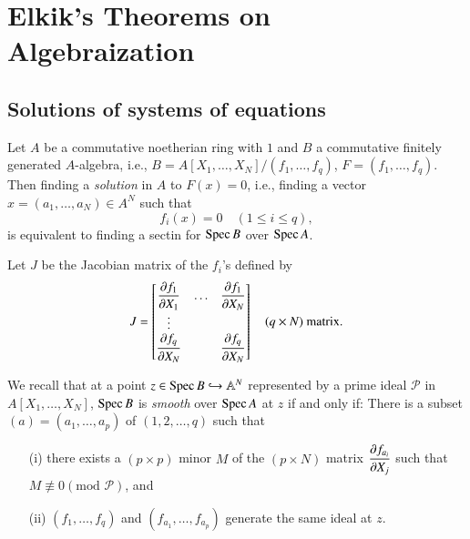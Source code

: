 
\makeatletter
\def\@makechapterhead#1{%
  \vspace*{50\p@}%
  {\parindent \z@ \raggedright \normalfont
    \ifnum \c@secnumdepth >\m@ne
      \if@mainmatter
        \huge\bfseries Part\space \thechapter
       \par\nobreak
        \vskip 20\p@
      \fi
    \fi
    \interlinepenalty\@M
    \Huge \bfseries #1 \par\nobreak
    \vskip 40\p@
  }}
\makeatother

\chapter{Elkik's Theorems on Algebraization}\label{part2}

\section{Solutions of systems of equations}\pageoriginale\label{part2-sec1}

Let $A$ be a commutative noetherian ring with $1$ and $B$ a
commutative finitely generated $A$-algebra, i.e.,
$B=A[X_{1},\ldots,X_{N}]/(f_{1},\ldots,f_{q})$,
$F=(f_{1},\ldots,f_{q})$. Then finding a {\em solution} in $A$ to
$F(x)=0$, i.e., finding a vector $x=(a_{1},\ldots, a_{N})\in A^{N}$
such that
$$
f_{i}(x)=0\quad (1\leq i\leq q),
$$
is equivalent to finding a sectin for $\operatorname{Spec} B$ over $\operatorname{Spec} A$.

Let $J$ be the Jacobian matrix of the $f_{i}$'s defined by
$$
J=
\begin{bmatrix}
\dfrac{\partial f_{1}}{\partial X_{1}} & \ldots & \dfrac{\partial f_{1}}{\partial X_{N}}\\
\vdots & &\\
\dfrac{\partial f_{q}}{\partial X_{N}} & & \dfrac{\partial f_{q}}{\partial X_{N}}
\end{bmatrix}
\quad (q\times N)\text{~ matrix}.
$$

We recall that at a point $z\in \operatorname{Spec} B\hookrightarrow \mathbb{A}^{N}$
represented by a prime ideal $\mathscr{P}$ in $A[X_{1},\ldots,X_{N}]$,
$\operatorname{Spec} B$ is {\em smooth} over $\operatorname{Spec} A$ at $z$ if and only if: There
is a subset $(a)=(a_{1},\ldots,a_{p})$ of $(1,2,\ldots,q)$ such that
\begin{itemize}
\item[(i)] there exists a $(p\times p)$ minor $M$ of the $(p\times N)$
  matrix $\dfrac{\partial f_{a_{i}}}{\partial X_{j}}$ such that $M\nequiv 0(\text{mod~}
  \mathscr{P})$, and 

\item[(ii)] $(f_{1},\ldots,f_{q})$ and $(f_{a_{1}},\ldots,f_{a_{p}})$
  generate the same ideal at $z$.
\end{itemize}

